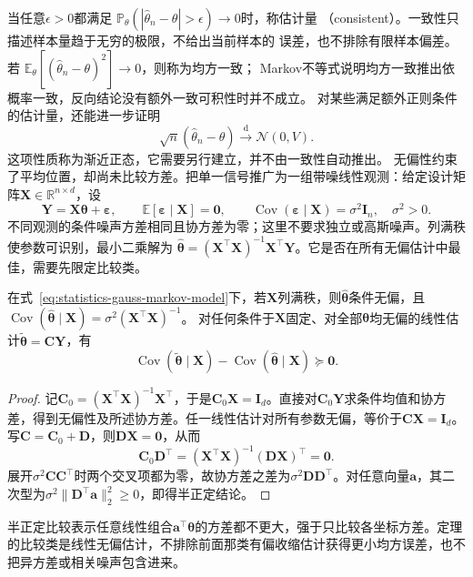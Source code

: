 当任意\(\epsilon>0\)都满足
\(\mathbb{P}_\theta(|\widehat\theta_n-\theta|>\epsilon)\to0\)时，称估计量
（consistent）。一致性只描述样本量趋于无穷的极限，不给出当前样本的
误差，也不排除有限样本偏差。若
\(\mathbb{E}_\theta[(\widehat\theta_n-\theta)^2]\to0\)，则称为均方一致；
Markov不等式说明均方一致推出依概率一致，反向结论没有额外一致可积性时并不成立。
对某些满足额外正则条件的估计量，还能进一步证明
\[
  \sqrt n(\widehat\theta_n-\theta)
  \xrightarrow{\mathrm d}\mathcal N(0,V).
\]
这项性质称为渐近正态，它需要另行建立，并不由一致性自动推出。
无偏性约束了平均位置，却尚未比较方差。把单一信号推广为一组带噪线性观测：给定设计矩阵\(\bm X\in\mathbb R^{n\times d}\)，设
\begin{equation}
  \bm Y=\bm X\bm\theta+\bm\varepsilon,\qquad
  \mathbb E[\bm\varepsilon\mid\bm X]=\bm0,\qquad
  \operatorname{Cov}(\bm\varepsilon\mid\bm X)=\sigma^2\bm I_n,
  \quad\sigma^2>0.
  \label{eq:statistics-gauss-markov-model}
\end{equation}
不同观测的条件噪声方差相同且协方差为零；这里不要求独立或高斯噪声。列满秩使参数可识别，最小二乘解为
\(\widehat{\bm\theta}=(\bm X^\top\bm X)^{-1}\bm X^\top\bm Y\)。它是否在所有无偏估计中最佳，需要先限定比较类。
\begin{theorem}
  \label{thm:statistics-gauss-markov}
  在式~\eqref{eq:statistics-gauss-markov-model}下，若\(\bm X\)列满秩，则\(\widehat{\bm\theta}\)条件无偏，且
  \(\operatorname{Cov}(\widehat{\bm\theta}\mid\bm X)=\sigma^2(\bm X^\top\bm X)^{-1}\)。
  对任何条件于\(\bm X\)固定、对全部\(\bm\theta\)均无偏的线性估计\(\widetilde{\bm\theta}=\bm C\bm Y\)，有
  \[
    \operatorname{Cov}(\widetilde{\bm\theta}\mid\bm X)
    -\operatorname{Cov}(\widehat{\bm\theta}\mid\bm X)\succeq\bm0.
  \]
\end{theorem}
\begin{proof}
记\(\bm C_0=(\bm X^\top\bm X)^{-1}\bm X^\top\)，于是\(\bm C_0\bm X=\bm I_d\)。直接对\(\bm C_0\bm Y\)求条件均值和协方差，得到无偏性及所述协方差。任一线性估计对所有参数无偏，等价于\(\bm C\bm X=\bm I_d\)。写\(\bm C=\bm C_0+\bm D\)，则\(\bm D\bm X=\bm0\)，从而
\[
  \bm C_0\bm D^\top
  =(\bm X^\top\bm X)^{-1}(\bm D\bm X)^\top=\bm0.
\]
展开\(\sigma^2\bm C\bm C^\top\)时两个交叉项都为零，故协方差之差为\(\sigma^2\bm D\bm D^\top\)。对任意向量\(\bm a\)，其二次型为\(\sigma^2\|\bm D^\top\bm a\|_2^2\geq0\)，即得半正定结论。
\end{proof}
半正定比较表示任意线性组合\(\bm a^\top\bm\theta\)的方差都不更大，强于只比较各坐标方差。定理的比较类是线性无偏估计，不排除前面那类有偏收缩估计获得更小均方误差，也不把异方差或相关噪声包含进来。

